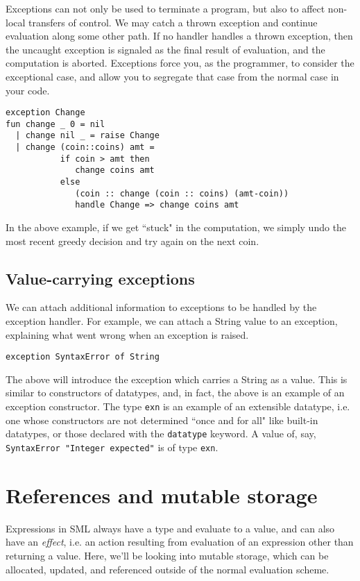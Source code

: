 \documentclass[11pt]{article}
\begin{document}
Exceptions can not only be used to terminate a program, but also to affect non-local transfers of control. We may catch a thrown exception and continue evaluation along some other path. If no handler handles a thrown exception, then the uncaught exception is signaled as the final result of evaluation, and the computation is aborted. Exceptions force you, as the programmer, to consider the exceptional case, and allow you to segregate that case from the normal case in your code.

\begin{verbatim}
exception Change
fun change _ 0 = nil
  | change nil _ = raise Change
  | change (coin::coins) amt =
           if coin > amt then
              change coins amt
           else
              (coin :: change (coin :: coins) (amt-coin))
              handle Change => change coins amt
\end{verbatim}

In the above example, if we get ``stuck" in the computation, we simply undo the most recent greedy decision and try again on the next coin.

\subsection{Value-carrying exceptions}

We can attach additional information to exceptions to be handled by the exception handler. For example, we can attach a String value to an exception, explaining what went wrong when an exception is raised.

\begin{verbatim}
exception SyntaxError of String
\end{verbatim}

The above will introduce the exception which carries a String as a value. This is similar to constructors of datatypes, and, in fact, the above is an example of an exception constructor. The type \verb~exn~ is an example of an extensible datatype, i.e. one whose constructors are not determined ``once and for all" like built-in datatypes, or those declared with the \verb~datatype~ keyword. A value of, say, \verb~SyntaxError "Integer expected"~ is of type \verb~exn~.

\section{References and mutable storage}

Expressions in SML always have a type and evaluate to a value, and can also have an \emph{effect}, i.e. an action resulting from evaluation of an expression other than returning a value. Here, we'll be looking into mutable storage, which can be allocated, updated, and referenced outside of the normal evaluation scheme.
\end{document}
